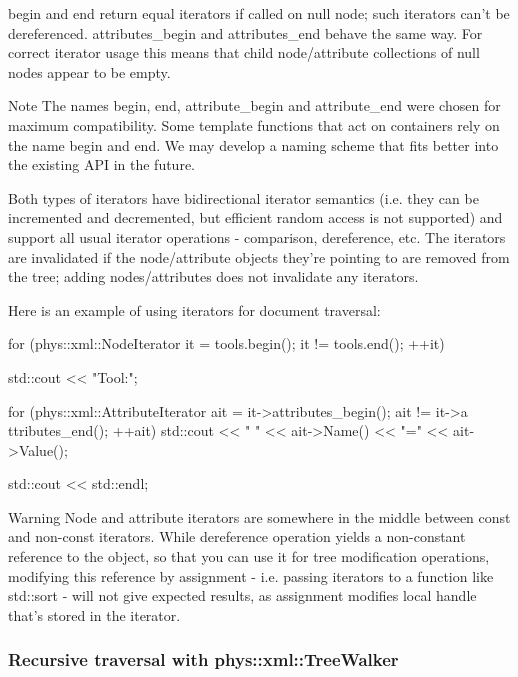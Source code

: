  \par
 begin and end return equal iterators if called on null node; such iterators can't be dereferenced. attributes\_\-begin and attributes\_\-end behave the same way. For correct iterator usage this means that child node/attribute collections of null nodes appear to be empty. \begin{DoxyNote}{Note}
The names begin, end, attribute\_\-begin and attribute\_\-end were chosen for maximum compatibility. Some template functions that act on containers rely on the name begin and end. We may develop a naming scheme that fits better into the existing API in the future.
\end{DoxyNote}
Both types of iterators have bidirectional iterator semantics (i.e. they can be incremented and decremented, but efficient random access is not supported) and support all usual iterator operations -\/ comparison, dereference, etc. The iterators are invalidated if the node/attribute objects they're pointing to are removed from the tree; adding nodes/attributes does not invalidate any iterators. \par
 \par
 Here is an example of using iterators for document traversal: 
\begin{DoxyCode}
 for (phys::xml::NodeIterator it = tools.begin(); it != tools.end(); ++it)
 {
     std::cout << "Tool:";

     for (phys::xml::AttributeIterator ait = it->attributes_begin(); ait != it->a
      ttributes_end(); ++ait)
     {
         std::cout << " " << ait->Name() << "=" << ait->Value();
     }

     std::cout << std::endl;
 }
\end{DoxyCode}
 \begin{DoxyWarning}{Warning}
Node and attribute iterators are somewhere in the middle between const and non-\/const iterators. While dereference operation yields a non-\/constant reference to the object, so that you can use it for tree modification operations, modifying this reference by assignment -\/ i.e. passing iterators to a function like std::sort -\/ will not give expected results, as assignment modifies local handle that's stored in the iterator.
\end{DoxyWarning}
\hypertarget{XMLManual_XMLAccessingWalker}{}\subsubsection{Recursive traversal with phys::xml::TreeWalker}\label{XMLManual_XMLAccessingWalker}
